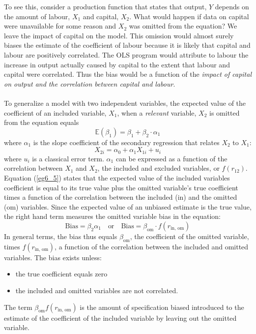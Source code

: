 \documentclass[11pt]{article}
\begin{document}
To see this, consider a production function that states that output, $Y$ depends on the amount of labour, $X_1$ and capital, $X_2$. What would happen if data on capital were unavailable for some reason and $X_2$ was omitted from the equation? We leave the impact of capital on the model. This omission would almost surely biases  the estimate of the coefficient of labour because it is likely that capital and labour are positively correlated. The OLS program would attribute to labour the increase in output actually caused by capital to the extent that labour and capital were correlated. Thus the bias would be a function of the \textit{impact of capital on output and the correlation between capital and labour}.\\ \\
To generalize a model with two independent variables, the expected value of the coefficient of an included variable, $X_1$, when a \textit{relevant} variable, $X_2$ is omitted from the equation equals
\begin{equation}
\mathbb{E}(\beta_1) = \beta_1 + \beta_2 \cdot \alpha_1 \label{eg6_5}
\end{equation}
where $\alpha_1$ is the slope coefficient of the secondary regression that relates $X_2$ to $X_1$:
\begin{equation}
X_{2i} = \alpha_0 + \alpha_1X_{1i} + u_i \label{eg6_6}
\end{equation}
where $u_i$ is a classical error term. $\alpha_1$ can be expressed as a function of the correlation between $X_1$ and $X_2$, the included and excluded variables, or $f(r_{12})$. Equation (\ref{eg6_5}) states that the expected value of the included variables coefficient is equal to its true value plus the omitted variable's true coefficient times a function of the correlation between the included (in) and the omitted (om) variables. Since the expected value of an unbiased estimate is the true value, the right hand term measures the omitted variable bias in the equation:
\begin{equation}
\text{Bias} = \beta_2\alpha_1 \quad \text{or} 
\quad \text{Bias} = \beta_{\text{om}} \cdot f(r_{\text{in, om}}) \label{eg6_7}
\end{equation}
In general terms, the bias thus equals $\beta_{\text{om}}$, the coefficient of the omitted variable, times $f(r_{\text{in, om}})$, a function of the correlation between the included and omitted variables. The bias exists unless:
\begin{itemize}
\item the true coefficient equals zero
\item the included and omitted variables are not correlated.
\end{itemize}
The term $\beta_{\text{om}}f(r_{\text{in, om}})$ is the amount of specification biased introduced to the estimate of the coefficient of the included variable by leaving out the omitted variable.
\clearpage
\end{document}
